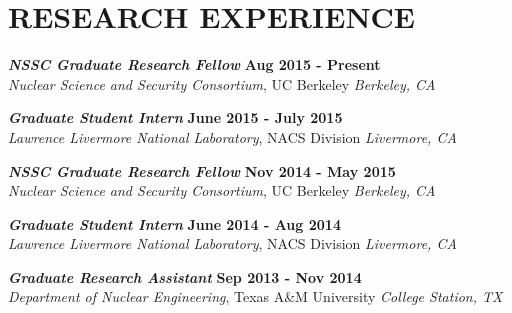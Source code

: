 \section{\small{RESEARCH EXPERIENCE}}

{\sl\bf NSSC Graduate Research Fellow} \hfill {\bf Aug 2015 - Present} \\
{\sl Nuclear Science and Security Consortium}, UC Berkeley \hfill {\sl Berkeley, CA}
\vspace{-5pt}

{\sl\bf Graduate Student Intern} \hfill {\bf June 2015 - July 2015} \\
{\sl Lawrence Livermore National Laboratory}, NACS Division \hfill {\sl Livermore, CA}
\vspace{-5pt}

{\sl\bf NSSC Graduate Research Fellow} \hfill {\bf Nov 2014 - May 2015} \\
{\sl Nuclear Science and Security Consortium}, UC Berkeley \hfill {\sl Berkeley, CA}
\vspace{-5pt}
 
{\sl\bf Graduate Student Intern} \hfill {\bf June 2014 - Aug 2014} \\
{\sl Lawrence Livermore National Laboratory}, NACS Division \hfill {\sl Livermore, CA}
\vspace{-5pt}

{\sl\bf Graduate Research Assistant} \hfill {\bf Sep 2013 - Nov 2014} \\
{\sl Department of Nuclear Engineering}, Texas A\&M University \hfill {\sl College Station, TX}